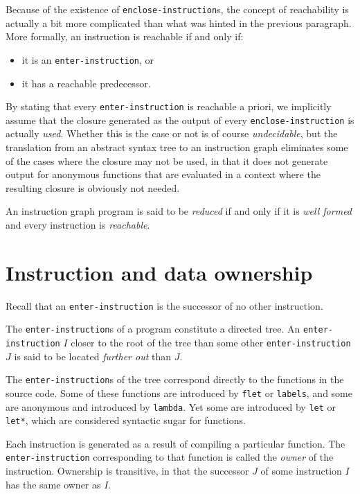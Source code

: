 Because of the existence of \texttt{enclose-instruction}s, the concept
of reachability is actually a bit more complicated than what was
hinted in the previous paragraph.  More formally, an instruction is
reachable if and only if:

\begin{itemize}
\item it is an \texttt{enter-instruction}, or
\item it has a reachable predecessor.
\end{itemize}

By stating that every \texttt{enter-instruction} is reachable a
priori, we implicitly assume that the closure generated as the output
of every \texttt{enclose-instruction} is actually \emph{used}.
Whether this is the case or not is of course \emph{undecidable}, but
the translation from an abstract syntax tree to an instruction graph
eliminates some of the cases where the closure may not be used, in
that it does not generate output for anonymous functions that are
evaluated in a context where the resulting closure is obviously not
needed.

An instruction graph program is said to be \emph{reduced} if and only
if it is \emph{well formed} and every instruction is \emph{reachable}.

\section{Instruction and data ownership}

Recall that an \texttt{enter-instruction} is the successor of no other
instruction.

The \texttt{enter-instruction}s of a program constitute a directed
tree.  An \texttt{enter-instruction} $I$ closer to the root of the
tree than some other \texttt{enter-instruction} $J$ is said to be
located \emph{further out} than $J$.

The \texttt{enter-instruction}s of the tree correspond directly to the
functions in the source code.  Some of these functions are introduced
by \texttt{flet} or \texttt{labels}, and some are anonymous and
introduced by \texttt{lambda}.  Yet some are introduced by
\texttt{let} or \texttt{let*}, which are considered syntactic sugar
for functions.

Each instruction is generated as a result of compiling a particular
function.  The \texttt{enter-instruction} corresponding to that
function is called the \emph{owner} of the instruction.  Ownership is
transitive, in that the successor $J$ of some instruction $I$ has the
same owner as $I$.

